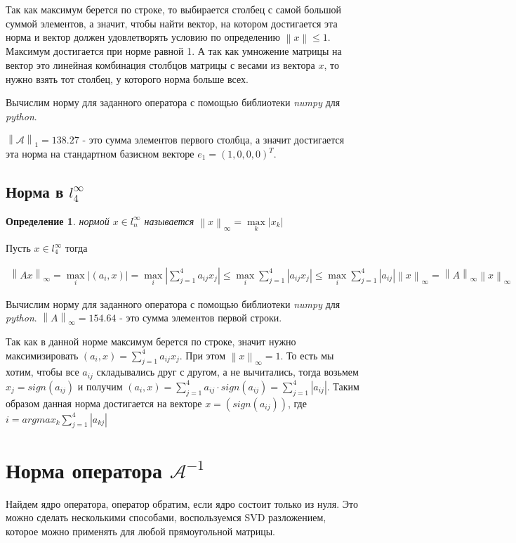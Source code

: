 \documentclass[a4paper]{article}
\newcommand{\norm}[1]{\left \lVert #1 \right \rVert}
\newtheorem{definition}{Определение}
\begin{document}
Так как максимум берется по строке, то выбирается столбец с самой большой суммой элементов, а значит, чтобы найти вектор, на котором достигается эта норма и вектор должен удовлетворять условию по определению $\norm{x} \le 1$.
Максимум достигается при норме равной 1. А так как умножение матрицы на вектор это линейная комбинация столбцов матрицы с весами из вектора $x$, то нужно взять тот столбец, у которого норма больше всех.

Вычислим норму для заданного оператора с помощью библиотеки \emph{numpy} для \emph{python}.

$\norm{\mathcal{A}}_{1} = 138.27$ - это сумма элементов первого столбца, а значит достигается эта норма на стандартном базисном векторе $e_1=(1, 0, 0, 0)^T$.

\subsection{Норма в \texorpdfstring{$l_{4}^{\infty}$}{}}
\begin{definition} нормой $x \in l_{n}^{\infty}$ называется
    $\norm{x}_\infty = \max\limits_{k}{|x_k|}$
\end{definition}

Пусть $x \in l_{4}^{\infty}$ тогда

\begin{align*}
\norm{Ax}_{\infty} = \max\limits_{i}{|(a_{i}, x)|} = \max\limits_{i} |\sum_{j=1}^{4} a_{ij}x_{j} | \le \max\limits_{i} \sum_{j=1}^{4}|a_{ij} x_j| \le  \max\limits_{i} \sum_{j=1}^{4}|a_{ij}| \norm{x}_{\infty} = \norm{A}_\infty \norm{x}_\infty
\end{align*}
 
Вычислим норму для заданного оператора с помощью библиотеки \emph{numpy} для \emph{python}.
$\norm{A}_\infty = 154.64$ - это сумма элементов первой строки.

Так как в данной норме максимум берется по строке, значит нужно максимизировать $(a_i, x) = \sum_{j=1}^{4}a_{ij}x_j$.
При этом $\norm{x}_\infty = 1$. То есть мы хотим, чтобы все $a_{ij}$ складывались друг с другом, а не вычитались, тогда возьмем $x_j = sign(a_{ij})$ и получим
$(a_i, x) = \sum_{j=1}^{4}a_{ij} \cdot sign(a_{ij}) = \sum_{j=1}^{4}|a_{ij}|$.
Таким образом данная норма достигается на векторе $x = (sign(a_{ij}))$, где $i = argmax_{k}{\sum_{j=1}^{4}|a_{kj}|}$


\section{Норма оператора \texorpdfstring{$\mathcal{A}^{-1}$}{}}
Найдем ядро оператора, оператор обратим, если ядро состоит только из нуля. Это можно сделать несколькими способами, воспользуемся SVD разложением, которое можно применять для любой прямоугольной матрицы. 
\end{document}
